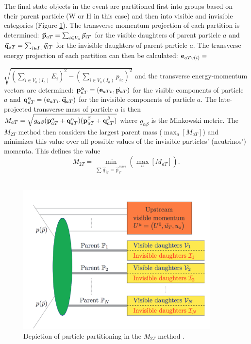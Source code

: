 The final state objects in the event are partitioned first into groups based on their parent particle (W or H in this case) and then into visible and invisible categories (Figure \ref{fig:m2t_diag}). The transverse momentum projection of each partition is determined: $\Vec{\bf{p}}_{aT}=\sum_{i \in V_a}\Vec{p}_{iT}$ for the visible daughters of parent particle $a$ and $\Vec{\bf{q}}_{aT}=\sum_{i \in I_a}\Vec{q}_{iT}$ for the invisible daughters of parent particle $a$. The transverse energy projection of each partition can then be calculated: ${\bf{e}}_{aTv(i)}=$

\noindent $\sqrt{(\sum_{i \in V_a(I_a)}E_i)^2-(\sum_{i \in V_{a}(I_a)}p_{iz})^2}$ and the transverse energy-momentum vectors are determined: ${\bf{p}}^{\alpha}_{aT}=({\bf{e}}_{aTv},\Vec{\bf{p}}_{aT})$ for the visible components of particle $a$ and ${\bf{q}}^{\alpha}_{aT}=({\bf{e}}_{aTi},\Vec{\bf{q}}_{aT})$ for the invisible components of particle $a$. The late-projected transverse mass of particle $a$ is then $M_{aT}=\sqrt{g_{\alpha\beta}({\bf{p}}^{\alpha}_{aT}+{\bf{q}}^{\alpha}_{aT})({\bf{p}}^{\beta}_{aT}+{\bf{q}}^{\beta}_{aT})}$ where $g_{\alpha\beta}$ is the Minkowski metric. The $M_{2T}$ method then considers the largest parent mass ($\max_{a}[M_{aT}]$) and minimizes this value over all possible values of the invisible particles' (neutrinos') momenta. This defines the value 
$$M_{2T}=\min_{\sum\Vec{q}_{iT}=\Vec{p}_T^{miss}}(\max_{a}[M_{aT}]).
$$\\

\begin{figure}[htb!]
    \centering
    \includegraphics[width=4in]{figures/chapter6/m2t_diag.png}
    \caption{Depiction of particle partitioning in the $M_{2T}$ method \cite{m2t}.}
    \label{fig:m2t_diag}
\end{figure}

